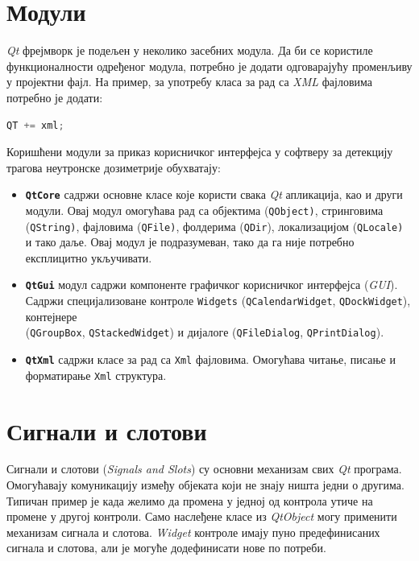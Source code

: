 \documentclass[11pt,a4paper,serbian,oneside]{book}
\begin{document}
\section{Модули}

\textit{Qt} фрејмворк је подељен у неколико засебних модула. Да би се користиле фун\-кци\-о\-нал\-но\-сти одређеног модула, потребно је додати одговарајућу променљиву у пројектни фајл. На пример, за употребу класа за рад са \textit{XML} фајловима потребно је додати:
\begin{lstlisting}[language=C++,label=lst:pro,caption=Укључивање модула за рад са \textit{XML} фајловима]
QT += xml;
\end{lstlisting}

Коришћени модули за приказ корисничког интерфејса у софтверу за детекцију трагова неутронске дозиметрије обухватају:
\begin{itemize}

  \item \textbf{\texttt{QtCore}} садржи основне класе које користи свака \textit{Qt} апликација, као и други модули. Овај модул омогућава рад са објектима (\texttt{QObject)}, стринговима (\texttt{QString)}, фајловима (\texttt{QFile)}, фолдерима (\texttt{QDir}), локализацијом (\texttt{QLocаle)} и тако даље. Овај модул је подразумеван, тако да га није потребно експлицитно укључивати.

  \item \textbf{\texttt{QtGui}} модул садржи компоненте графичког корисничког интерфејса (\textit{GUI}). Садржи специјализоване контроле \texttt{Widgets} (\texttt{QCalendarWidget}, \texttt{QDockWidget}), кон\-теј\-не\-ре \\ (\texttt{QGroupBox}, \texttt{QStackedWidget}) и дијалоге (\texttt{QFileDialog}, \texttt{QPrintDialog}).

  \item \textbf{\texttt{QtXml}} садржи класе за рад са \texttt{Xml} фајловима. Омогућава читање, писање и фор\-ма\-ти\-ра\-ње \texttt{Xml} структура.

\end{itemize}

\section{Сигнали и слотови}

Сигнали и слотови (\textit{Signals and Slots}) су основни механизам свих \textit{Qt} програма. Омо\-гу\-ћа\-ва\-ју комуникацију између објеката који не знају ништа једни о другима. Типичан пример је када желимо да промена у једној од контрола утиче на промене у другој контроли. Само наслеђене класе из \textit{QtObject} могу применити механизам сигнала и слотова. \textit{Widget} контроле имају пуно предефинисаних сигнала и слотова, али је могуће додефинисати нове по потреби.
\end{document}
